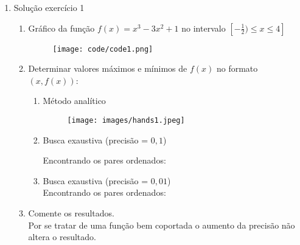 \documentclass[a4paper, 12pt]{article}
\begin{document}
\maketitle %

\begin{enumerate}
   \item Solução exercício 1
   \begin{enumerate}
	   \item Gráfico da função $f(x) = x^{3}-3x^{2}+1$ no intervalo $[-\frac{1}{2}) \leq x \leq 4]$
            

            \begin{figure}[h!]
                \begin{center}
                    \texttt{[image: code/code1.png]}
                \end{center}
            \end{figure}
	   \item Determinar valores máximos e mínimos de $f(x)$ no formato $(x,f(x))$:
            \begin{enumerate}[{b}.1)]
                \item Método analítico
                    \newpage
                    \begin{figure}[h!]
                      \begin{center}
                          \texttt{[image: images/hands1.jpeg]}
                      \end{center}
                    \end{figure}
                \item Busca exaustiva (precisão = $0,1$)

                    Encontrando os pares ordenados:
                    
                \item Busca exaustiva (precisão = $0,01$)
                    \\
                    Encontrando os pares ordenados:
                    
            \end{enumerate}
        \item Comente os resultados.
            \\
            Por se tratar de uma função bem coportada o aumento
            da precisão não altera o resultado.
   \end{enumerate}


\end{enumerate}
\end{document}
